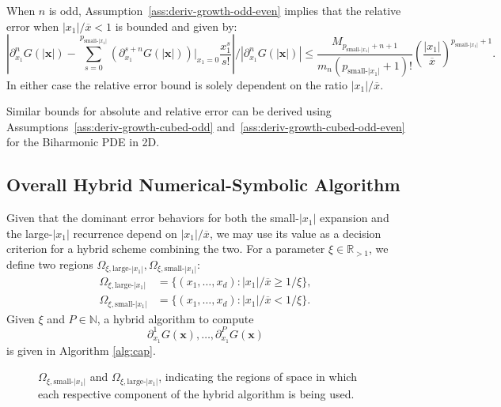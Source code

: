 \documentclass[12pt]{article}
\def\N{{\mathbb N}}
\def\R{{\mathbb R}}
\let\b=\boldsymbol
\theoremstyle{definition}
\theoremstyle{plain}
\theoremstyle{definition}
\begin{document}
When $n$ is odd, Assumption~\ref{ass:deriv-growth-odd-even} implies that the relative error when $|x_1|/\overline{x} < 1$ is bounded and given by:
\begin{equation}
\label{eq:odd-rel-error}
\left|\partial^n_{x_1} G(|\b{x}|) - \sum_{s=0}^{p_{\text{small-$|x_1|$}}} \left( \partial^{s+n}_{x_1} G(|\b{x}|) \right)|_{x_1=0} \frac{x_1^s}{s!} \right| / \left| \partial^n_{x_1} G(|\b{x}|)  \right| \leq \frac{M_{p_{\text{small-$|x_1|$}}+n+1}}{m_n(p_{\text{small-$|x_1|$}}+1)!} \left(\frac{|x_1|}{\overline{x}} \right)^{p_{\text{small-$|x_1|$}}+1}.
\end{equation}
In either case the relative error bound is solely dependent on the ratio ${|x_1|}/{\overline{x}}$. 

Similar bounds for absolute and relative error can be derived using Assumptions~\ref{ass:deriv-growth-cubed-odd} and~\ref{ass:deriv-growth-cubed-odd-even} for the Biharmonic PDE in 2D.


\subsection{Overall Hybrid Numerical-Symbolic Algorithm}
Given that the dominant error behaviors for both the small-$|x_1|$ expansion and the large-$|x_1|$ recurrence depend on $|x_1|/\overline{x}$, we may use its value as a decision criterion for a hybrid scheme combining the two. For a parameter $\xi \in \R_{> 1}$, we define two regions $\Omega_{\xi,\text{large-$|x_1|$}}, \Omega_{\xi,\text{small-$|x_1|$}}$:
\begin{align*}
\Omega_{\xi,\text{large-$|x_1|$}} &= \{(x_1, \dots, x_d): |x_1|/\overline{x}\geq 1/\xi \},\\
\Omega_{\xi,\text{small-$|x_1|$}} &= \{(x_1, \dots, x_d): |x_1|/\overline{x}< 1/\xi \}.
\end{align*}
Given $\xi$ and $P\in \N$, a hybrid algorithm to compute 
\[
\partial^1_{x_1} G(\b{x}), \dots, \partial^P_{x_1} G(\b{x})
\]
is given in Algorithm \ref{alg:cap}.

\begin{figure}[!ht]
\centering
{}

\caption{
$\Omega_{\xi,\text{small-$|x_1|$}}$ and $\Omega_{\xi,\text{large-$|x_1|$}}$, indicating
the regions of space in which each respective component of the hybrid algorithm
is being used.
}
\end{figure}
\end{document}
